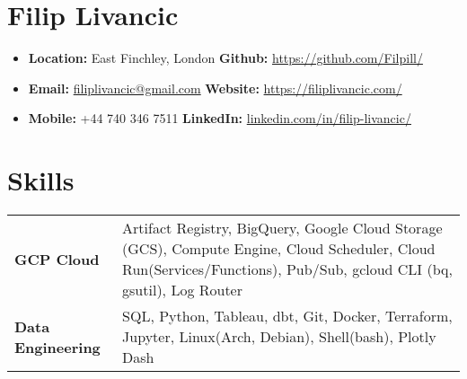 \documentclass[a4paper, 10pt]{article}
\date{}
\begin{document}
\vspace*{-9.0mm}

\section*{Filip Livancic}
\vspace{-2.5mm}

{\small
\begin{itemize}[itemsep=0.0em]
    \item[] \faMapO \hspace{1mm} \textbf{Location:} \hspace{0.2mm}East Finchley, London 
        \hspace{55.5mm} \faGithub \hspace{2mm} \textbf{Github:} \hspace{2,5mm} \url{https://github.com/Filpill/}
    \item[] \faEnvelope \hspace{1.6mm} \textbf{Email:} \hspace{3.5mm} \href{mailto:filiplivancic@gmail.com}{filiplivancic@gmail.com} 
        \hspace{52.3mm} \faGlobe \hspace{2mm} \textbf{Website:} \hspace{1.2mm} \url{https://filiplivancic.com/}
    \item[] \faPhone \hspace{2.2mm} \textbf{Mobile:} \hspace{1.5mm} +44 740 346 7511
        \hspace{59.4mm} \faLinkedinSquare \hspace{2mm} \textbf{LinkedIn:} \hspace{0.5mm}\url{linkedin.com/in/filip-livancic/}
\end{itemize}
}

\vspace{-4.5mm}
\section*{Skills}
\vspace{-7.5mm}

\begin{table}[h!]
\centering
\renewcommand{\arraystretch}{1.2}
\begin{tabular}{@{} l p{16cm} @{}}
  \textbf{GCP Cloud} & Artifact Registry, BigQuery, Google Cloud Storage (GCS), Compute Engine, Cloud Scheduler, Cloud Run(Services/Functions), Pub/Sub, gcloud CLI (bq, gsutil), Log Router \\
  \textbf{Data Engineering} & SQL, Python, Tableau, dbt, Git, Docker, Terraform, Jupyter, Linux(Arch, Debian), Shell(bash), Plotly Dash \\
\end{tabular}
\end{table}
\end{document}
